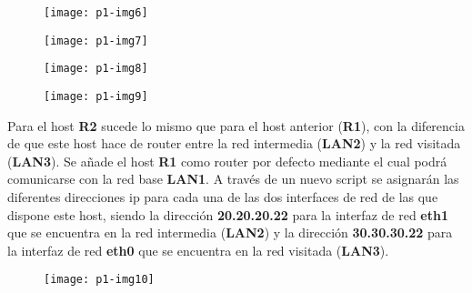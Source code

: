 \documentclass[10pt]{article}
\begin{document}
\begin{figure}[H]
	\begin{center}
 		\texttt{[image: p1-img6]}
	\end{center} 
\end{figure}

\begin{figure}[H]
	\begin{center}
 		\texttt{[image: p1-img7]}
	\end{center} 
\end{figure}

\begin{figure}[H]
	\begin{center}
 		\texttt{[image: p1-img8]}
	\end{center} 
\end{figure}

\begin{figure}[H]
	\begin{center}
 		\texttt{[image: p1-img9]}
	\end{center} 
\end{figure}


Para el host \textbf{R2} sucede lo mismo que para el host anterior (\textbf{R1}), con la diferencia de que este host hace de router entre la red intermedia (\textbf{LAN2}) y la red visitada (\textbf{LAN3}). Se añade el host \textbf{R1} como router por defecto mediante el cual podrá comunicarse con la red base \textbf{LAN1}. A través de un nuevo script se asignarán las diferentes direcciones ip para cada una de las dos interfaces de red de las que dispone este host, siendo la dirección \textbf{20.20.20.22} para la interfaz de red \textbf{eth1} que se encuentra en la red intermedia (\textbf{LAN2}) y la dirección \textbf{30.30.30.22} para la interfaz de red \textbf{eth0} que se encuentra en la red visitada (\textbf{LAN3}). \\

\begin{figure}[H]
	\begin{center}
 		\texttt{[image: p1-img10]}
	\end{center} 
\end{figure}
\end{document}

